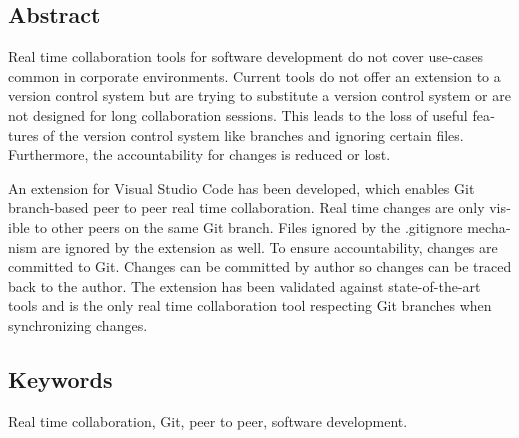 
\begin{otherlanguage}{english}

  \chapter*{Abstract}

  Real time collaboration tools for software development do not cover use-cases common in corporate environments. Current tools do not offer an extension to a version control system but are trying to substitute a version control system or are not designed for long collaboration sessions. This leads to the loss of useful features of the version control system like branches and ignoring certain files. Furthermore, the accountability for changes is reduced or lost.

  An extension for Visual Studio Code has been developed, which enables Git branch-based peer to peer real time collaboration. Real time changes are only visible to other peers on the same Git branch. Files ignored by the .gitignore mechanism are ignored by the extension as well. To ensure accountability, changes are committed to Git. Changes can be committed by author so changes can be traced back to the author. The extension has been validated against state-of-the-art tools and is the only real time collaboration tool respecting Git branches when synchronizing changes.

  \bigskip

  \section*{Keywords}
  Real time collaboration, Git, peer to peer, software development.

\end{otherlanguage}
